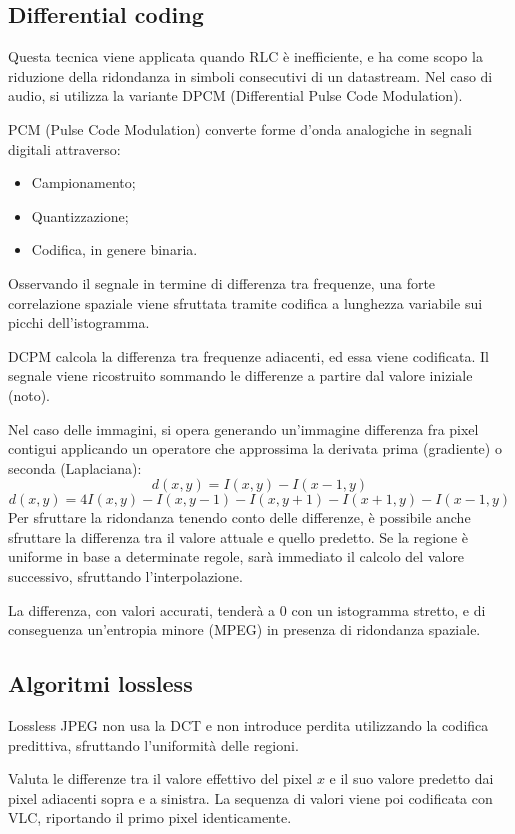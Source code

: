\subsection{Differential coding}
Questa tecnica viene applicata quando RLC è inefficiente, e ha come scopo la riduzione della ridondanza in simboli consecutivi di un datastream. Nel caso di audio, si utilizza la variante DPCM (Differential Pulse Code Modulation).

PCM (Pulse Code Modulation) converte forme d'onda analogiche in segnali digitali attraverso:
\begin{itemize}
	\item Campionamento;
	\item Quantizzazione;
	\item Codifica, in genere binaria.
\end{itemize}

Osservando il segnale in termine di differenza tra frequenze, una forte correlazione spaziale viene sfruttata tramite codifica a lunghezza variabile sui picchi dell'istogramma.

DCPM calcola la differenza tra frequenze adiacenti, ed essa viene codificata. Il segnale viene ricostruito sommando le differenze a partire dal valore iniziale (noto).

Nel caso delle immagini, si opera generando un'immagine differenza fra pixel contigui applicando un operatore che approssima la derivata prima (gradiente) o seconda (Laplaciana):
$$d(x, y) = I(x, y) - I(x - 1, y)$$
$$d(x, y) = 4I(x, y) - I(x, y - 1) - I(x, y + 1) - I(x + 1, y) - I(x - 1, y)$$
Per sfruttare la ridondanza tenendo conto delle differenze, è possibile anche sfruttare la differenza tra il valore attuale e quello predetto. Se la regione è uniforme in base a determinate regole, sarà immediato il calcolo del valore successivo, sfruttando l'interpolazione. 

La differenza, con valori accurati, tenderà a 0 con un istogramma stretto, e di conseguenza un'entropia minore (MPEG) in presenza di ridondanza spaziale. 

\subsection{Algoritmi lossless}
Lossless JPEG non usa la DCT e non introduce perdita utilizzando la codifica predittiva, sfruttando l'uniformità delle regioni. 

Valuta le differenze tra il valore effettivo del pixel $x$ e il suo valore predetto dai pixel adiacenti sopra e a sinistra. La sequenza di valori viene poi codificata con VLC, riportando il primo pixel identicamente. 

